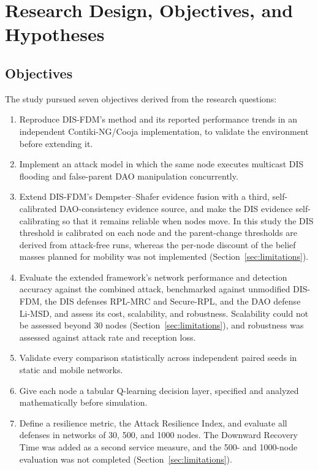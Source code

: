 \section{Research Design, Objectives, and Hypotheses}\label{sec:design}
\subsection{Objectives}
The study pursued seven objectives derived from the research questions:
\begin{enumerate}
\item[O1:] Reproduce DIS-FDM's method and its reported performance trends in an independent Contiki-NG/Cooja implementation, to validate the environment before extending it.
\item[O2:] Implement an attack model in which the same node executes multicast DIS flooding and false-parent DAO manipulation concurrently.
\item[O3:] Extend DIS-FDM's Dempster--Shafer evidence fusion with a third, self-calibrated DAO-consistency evidence source, and make the DIS evidence self-calibrating so that it remains reliable when nodes move. In this study the DIS threshold is calibrated on each node and the parent-change thresholds are derived from attack-free runs, whereas the per-node discount of the belief masses planned for mobility was not implemented (Section~\ref{sec:limitations}).
\item[O4:] Evaluate the extended framework's network performance and detection accuracy against the combined attack, benchmarked against unmodified DIS-FDM, the DIS defenses RPL-MRC and Secure-RPL, and the DAO defense Li-MSD, and assess its cost, scalability, and robustness. Scalability could not be assessed beyond 30 nodes (Section~\ref{sec:limitations}), and robustness was assessed against attack rate and reception loss.
\item[O5:] Validate every comparison statistically across independent paired seeds in static and mobile networks.
\item[O6:] Give each node a tabular Q-learning decision layer, specified and analyzed mathematically before simulation.
\item[O7:] Define a resilience metric, the Attack Resilience Index, and evaluate all defenses in networks of 30, 500, and 1000 nodes. The Downward Recovery Time was added as a second service measure, and the 500- and 1000-node evaluation was not completed (Section~\ref{sec:limitations}).
\end{enumerate}

